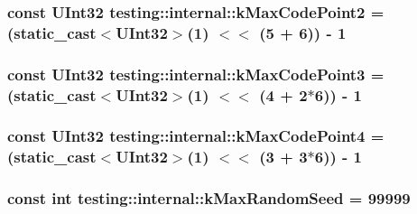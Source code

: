 \hypertarget{namespacetesting_1_1internal_ab8f4a5ed784352f00342cfeadc72337e}{
\subsubsection[{k\-Max\-Code\-Point2}]{\setlength{\rightskip}{0pt plus 5cm}const {\bf U\-Int32} testing\-::internal\-::k\-Max\-Code\-Point2 = (static\-\_\-cast$<${\bf U\-Int32}$>$(1) $<$$<$ (5 + 6)) -\/ 1}}\label{namespacetesting_1_1internal_ab8f4a5ed784352f00342cfeadc72337e}
\hypertarget{namespacetesting_1_1internal_aa42bd507418e570402996e33582beed3}{
\subsubsection[{k\-Max\-Code\-Point3}]{\setlength{\rightskip}{0pt plus 5cm}const {\bf U\-Int32} testing\-::internal\-::k\-Max\-Code\-Point3 = (static\-\_\-cast$<${\bf U\-Int32}$>$(1) $<$$<$ (4 + 2$\ast$6)) -\/ 1}}\label{namespacetesting_1_1internal_aa42bd507418e570402996e33582beed3}
\hypertarget{namespacetesting_1_1internal_acd87c60be9b5fedb2d017503d8834474}{
\subsubsection[{k\-Max\-Code\-Point4}]{\setlength{\rightskip}{0pt plus 5cm}const {\bf U\-Int32} testing\-::internal\-::k\-Max\-Code\-Point4 = (static\-\_\-cast$<${\bf U\-Int32}$>$(1) $<$$<$ (3 + 3$\ast$6)) -\/ 1}}\label{namespacetesting_1_1internal_acd87c60be9b5fedb2d017503d8834474}
\hypertarget{namespacetesting_1_1internal_a41bd421ace53d23dbe85d9618c3afaee}{
\subsubsection[{k\-Max\-Random\-Seed}]{\setlength{\rightskip}{0pt plus 5cm}const int testing\-::internal\-::k\-Max\-Random\-Seed = 99999}}\label{namespacetesting_1_1internal_a41bd421ace53d23dbe85d9618c3afaee}
